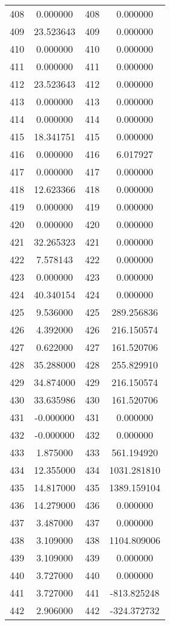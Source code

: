 \documentclass[12pt]{article}
\begin{document}
\begin{longtable}{@{}cccc@{}}
408 & 0.000000 & 408 & 0.000000 \\
409 & 23.523643 & 409 & 0.000000 \\
410 & 0.000000 & 410 & 0.000000 \\
411 & 0.000000 & 411 & 0.000000 \\
412 & 23.523643 & 412 & 0.000000 \\
413 & 0.000000 & 413 & 0.000000 \\
414 & 0.000000 & 414 & 0.000000 \\
415 & 18.341751 & 415 & 0.000000 \\
416 & 0.000000 & 416 & 6.017927 \\
417 & 0.000000 & 417 & 0.000000 \\
418 & 12.623366 & 418 & 0.000000 \\
419 & 0.000000 & 419 & 0.000000 \\
420 & 0.000000 & 420 & 0.000000 \\
421 & 32.265323 & 421 & 0.000000 \\
422 & 7.578143 & 422 & 0.000000 \\
423 & 0.000000 & 423 & 0.000000 \\
424 & 40.340154 & 424 & 0.000000 \\
425 & 9.536000 & 425 & 289.256836 \\
426 & 4.392000 & 426 & 216.150574 \\
427 & 0.622000 & 427 & 161.520706 \\
428 & 35.288000 & 428 & 255.829910 \\
429 & 34.874000 & 429 & 216.150574 \\
430 & 33.635986 & 430 & 161.520706 \\
431 & -0.000000 & 431 & 0.000000 \\
432 & -0.000000 & 432 & 0.000000 \\
433 & 1.875000 & 433 & 561.194920 \\
434 & 12.355000 & 434 & 1031.281810 \\
435 & 14.817000 & 435 & 1389.159104 \\
436 & 14.279000 & 436 & 0.000000 \\
437 & 3.487000 & 437 & 0.000000 \\
438 & 3.109000 & 438 & 1104.809006 \\
439 & 3.109000 & 439 & 0.000000 \\
440 & 3.727000 & 440 & 0.000000 \\
441 & 3.727000 & 441 & -813.825248 \\
442 & 2.906000 & 442 & -324.372732 \\

\end{longtable}
\end{document}
